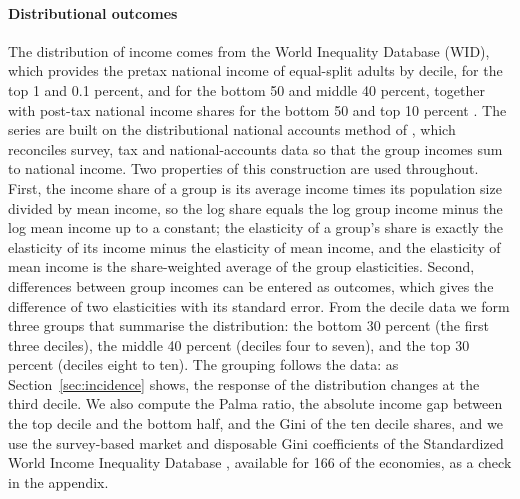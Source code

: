 \paragraph{Distributional outcomes}
The distribution of income comes from the World Inequality Database (WID), which provides the pretax national income of equal-split adults by decile, for the top 1 and 0.1 percent, and for the bottom 50 and middle 40 percent, together with post-tax national income shares for the bottom 50 and top 10 percent \citep{WID_2024}. The series are built on the distributional national accounts method of \citet{Piketty_2017}, which reconciles survey, tax and national-accounts data so that the group incomes sum to national income. Two properties of this construction are used throughout. First, the income share of a group is its average income times its population size divided by mean income, so the log share equals the log group income minus the log mean income up to a constant; the elasticity of a group's share is exactly the elasticity of its income minus the elasticity of mean income, and the elasticity of mean income is the share-weighted average of the group elasticities. Second, differences between group incomes can be entered as outcomes, which gives the difference of two elasticities with its standard error. From the decile data we form three groups that summarise the distribution: the bottom 30 percent (the first three deciles), the middle 40 percent (deciles four to seven), and the top 30 percent (deciles eight to ten). The grouping follows the data: as Section~\ref{sec:incidence} shows, the response of the distribution changes at the third decile. We also compute the Palma ratio, the absolute income gap between the top decile and the bottom half, and the Gini of the ten decile shares, and we use the survey-based market and disposable Gini coefficients of the Standardized World Income Inequality Database \citep{Solt_2020}, available for 166 of the economies, as a check in the appendix.

